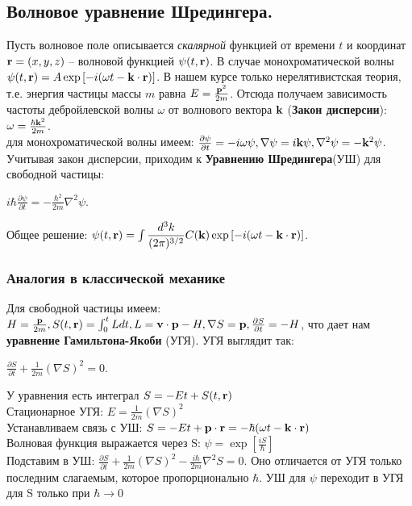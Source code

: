 \subsection*{Волновое уравнение Шредингера.}
Пусть волновое поле описывается { \it скалярной} функцией от времени $t$ и координат ${\bf r} = (x,y,z)$ -- волновой функцией $\psi (t, {\bf r})$. В случае монохроматической волны  $\psi (t, {\bf r}) = A\exp{[-i(\omega t - {\bf k \cdot r})]}$. В нашем курсе только нерелятивистская теория, т.е. энергия частицы массы $m$ равна $E = \frac{{\bf p}^2}{2m}$. Отсюда получаем зависимость частоты дебройлевской волны $\omega$ от волнового вектора ${\bf k}$ ({\bf Закон дисперсии}): $\omega = \frac{\hbar {\bf k}^2}{2m}$.\\
для монохроматической волны имеем: $\frac{\partial \psi}{\partial t} = -i\omega \psi, \nabla \psi = i{\bf k}\psi, \nabla^2\psi = -{\bf k}^2\psi $. Учитывая закон дисперсии, приходим к {\bf Уравнению Шредингера}(УШ) для свободной частицы:\\
\begin{center}
$i\hbar\frac{\partial \psi}{\partial t} = - \frac{\hbar^2}{2m}\nabla^2 \psi$.
\end{center}
Общее решение: $\psi (t, {\bf r})  = \int \dfrac{d^3k}{(2\pi)^{3/2}}C({\bf k})\exp{[-i(\omega t - {\bf k \cdot r})]}$.
\subsubsection*{Аналогия в классической механике}
Для свободной частицы имеем: $H = \frac{{\bf p}}{2m}, S(t,{\bf r}) = \int_0^tLdt, L = {\bf v \cdot p} - H, \nabla S = {\bf p}, \frac{\partial S}{\partial t} = - H$, что дает нам
{\bf уравнение Гамильтона-Якоби} (УГЯ). УГЯ выглядит так:
\begin{center}
$\frac{\partial S}{\partial t} + \frac{1}{2m}(\nabla S)^2 = 0$.
\end{center}
У уравнения есть интеграл $S = -Et+ S(t, {\bf r})$\\
Стационарное УГЯ: $E =  \frac{1}{2m}(\nabla S)^2 $\\
Устанавливаем связь с УШ: $S = -Et + {\bf p \cdot r} = -\hbar (\omega t - {\bf k \cdot r})$\\
Волновая функция выражается через S: $\psi = \exp{[\frac{iS}{\hbar}]}$\\
Подставим в УШ: $\frac{\partial S}{\partial t} + \frac{1}{2m}(\nabla S)^2 - \frac{i\hbar}{2m}\nabla^2S = 0$. Оно отличается от УГЯ только последним слагаемым, которое пропорционально $\hbar$. УШ для $\psi$ переходит в УГЯ для S только при $\hbar \rightarrow 0$


